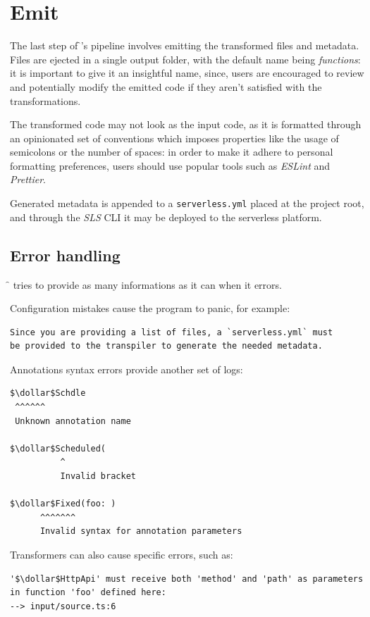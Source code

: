 
\section{Emit}

The last step of \f{}'s pipeline involves emitting the transformed files and metadata.
Files are ejected in a single output folder,
with the default name being \textit{functions}: it is important to give it an insightful name,
since, users are encouraged to review and potentially modify the emitted code
if they aren't satisfied with the transformations.

The transformed code may not look as the input code, as it is formatted
through an opinionated set of conventions which imposes properties like
the usage of semicolons or the number of spaces:
in order to make it adhere to personal formatting preferences,
users should use popular tools such as \textit{ESLint} and \textit{Prettier}.

Generated metadata is appended to a \verb|serverless.yml| placed at the project root,
and through the \textit{SLS} CLI it may be deployed to the serverless platform.

\subsection{Error handling}

\f{} tries to provide as many informations as it can when it errors.

Configuration mistakes cause the program to panic, for example:
\begin{lstlisting}[language=console]
Since you are providing a list of files, a `serverless.yml` must
be provided to the transpiler to generate the needed metadata.
\end{lstlisting}

Annotations syntax errors provide another set of logs:
\begin{lstlisting}[language=console]
$\dollar$Schdle
 ^^^^^^
 Unknown annotation name

$\dollar$Scheduled(
          ^
          Invalid bracket

$\dollar$Fixed(foo: )
      ^^^^^^^
      Invalid syntax for annotation parameters
\end{lstlisting}

Transformers can also cause specific errors, such as:
\begin{lstlisting}[language=console]
'$\dollar$HttpApi' must receive both 'method' and 'path' as parameters
in function 'foo' defined here:
--> input/source.ts:6
\end{lstlisting}
